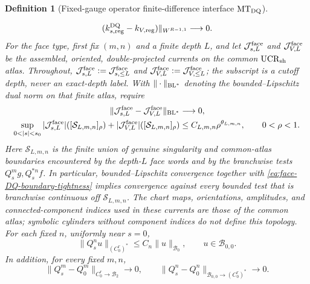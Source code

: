 \documentclass[11pt]{article}
\newtheorem{definition}[theorem]{Definition}
\newcommand{\cB}{\mathcal B}
\begin{document}
\begin{definition}[Fixed-gauge operator finite-difference interface
$\mathrm{MT}_{\rm DQ}$]
\begin{enumerate}[label=\textup{(MT\arabic*)}]
\begin{equation}
       (k_{s,\rm reg}^{\rm DQ}-k_{V,\rm reg})\|_{W^{R-1,1}}
       \longrightarrow0.
      \end{equation}
      For the face type, first fix $(m,n)$ and a finite depth $L$, and let
      $\mathcal J_{s,L}^{\rm face}$ and $\mathcal J_{V,L}^{\rm face}$ be the
      assembled, oriented, double-projected currents on the common
      $\mathrm{UCR}_{\rm sh}$ atlas.  Throughout,
      $\mathcal J_{s,L}^{\rm face}:=\mathcal J_{s,\le L}^{\rm face}$ and
      $\mathcal J_{V,L}^{\rm face}:=\mathcal J_{V,\le L}^{\rm face}$; the
      subscript is a cutoff depth, never an exact-depth label.  With
      $\|\cdot\|_{\rm BL^*}$ denoting
      the bounded--Lipschitz dual norm on that finite atlas, require
      \begin{align}
       \|\mathcal J_{s,L}^{\rm face}
          -\mathcal J_{V,L}^{\rm face}\|_{\rm BL^*}&\longrightarrow0,
       \label{eq:face-DQ-weak-convergence}\\
       \sup_{0<|s|<s_0}|\mathcal J_{s,L}^{\rm face}|
          ([\mathcal S_{L,m,n}]_\rho)
       +|\mathcal J_{V,L}^{\rm face}|([\mathcal S_{L,m,n}]_\rho)
          &\le C_{L,m,n}\rho^{\theta_{L,m,n}},\qquad 0<\rho<1.
       \label{eq:face-DQ-boundary-tightness}
      \end{align}
      Here $\mathcal S_{L,m,n}$ is the finite union of genuine singularity
      and common-atlas boundaries encountered by the depth-$L$ face words
      and by the branchwise tests $Q_s^mg,Q_s^{*n}f$.  In
      particular, bounded--Lipschitz convergence together with
      \eqref{eq:face-DQ-boundary-tightness} implies convergence against every
      bounded test that is branchwise continuous off $\mathcal S_{L,m,n}$.
      The
      chart maps, orientations, amplitudes, and connected-component indices
      used in these currents are those of the common atlas; symbolic
      cylinders without component indices do not define this topology.  For
      each fixed $n$, uniformly near $s=0$,
      \begin{equation}
      \label{eq:DQ-side-fixed-time-continuity}
       \|Q_s^nu\|_{(C^r_0)^*}\le C_n\|u\|_{\cB_0},
       \qquad u\in\cB_{0,0}.
      \end{equation}
      In addition, for every fixed $m,n$,
      \begin{equation}
      \label{eq:fixed-time-evolution-convergence}
       \|Q_s^m-Q_0^m\|_{C^r_0\to\cB_2}\longrightarrow0,
       \qquad
       \|Q_s^n-Q_0^n\|_{\cB_{0,0}\to(C^r_0)^*}\longrightarrow0.
      \end{equation}

\end{enumerate}
\end{definition}
\end{document}
